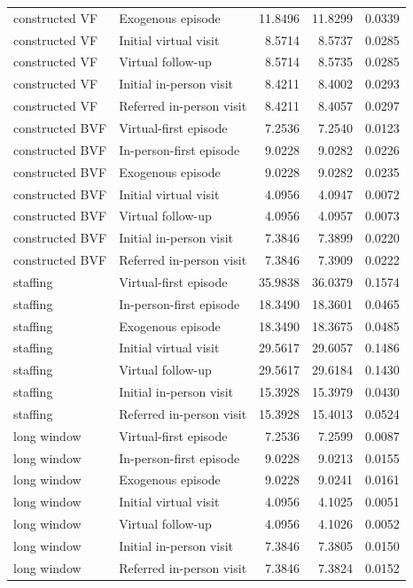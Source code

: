 \begin{longtable}{llrrr}
constructed VF & Exogenous episode & 11.8496 & 11.8299 & 0.0339\\
constructed VF & Initial virtual visit & 8.5714 & 8.5737 & 0.0285\\
constructed VF & Virtual follow-up & 8.5714 & 8.5735 & 0.0285\\
constructed VF & Initial in-person visit & 8.4211 & 8.4002 & 0.0293\\
constructed VF & Referred in-person visit & 8.4211 & 8.4057 & 0.0297\\
constructed BVF & Virtual-first episode & 7.2536 & 7.2540 & 0.0123\\
constructed BVF & In-person-first episode & 9.0228 & 9.0282 & 0.0226\\
constructed BVF & Exogenous episode & 9.0228 & 9.0282 & 0.0235\\
constructed BVF & Initial virtual visit & 4.0956 & 4.0947 & 0.0072\\
constructed BVF & Virtual follow-up & 4.0956 & 4.0957 & 0.0073\\
constructed BVF & Initial in-person visit & 7.3846 & 7.3899 & 0.0220\\
constructed BVF & Referred in-person visit & 7.3846 & 7.3909 & 0.0222\\
staffing & Virtual-first episode & 35.9838 & 36.0379 & 0.1574\\
staffing & In-person-first episode & 18.3490 & 18.3601 & 0.0465\\
staffing & Exogenous episode & 18.3490 & 18.3675 & 0.0485\\
staffing & Initial virtual visit & 29.5617 & 29.6057 & 0.1486\\
staffing & Virtual follow-up & 29.5617 & 29.6184 & 0.1430\\
staffing & Initial in-person visit & 15.3928 & 15.3979 & 0.0430\\
staffing & Referred in-person visit & 15.3928 & 15.4013 & 0.0524\\
long window & Virtual-first episode & 7.2536 & 7.2599 & 0.0087\\
long window & In-person-first episode & 9.0228 & 9.0213 & 0.0155\\
long window & Exogenous episode & 9.0228 & 9.0241 & 0.0161\\
long window & Initial virtual visit & 4.0956 & 4.1025 & 0.0051\\
long window & Virtual follow-up & 4.0956 & 4.1026 & 0.0052\\
long window & Initial in-person visit & 7.3846 & 7.3805 & 0.0150\\
long window & Referred in-person visit & 7.3846 & 7.3824 & 0.0152\\
\bottomrule\end{longtable}
